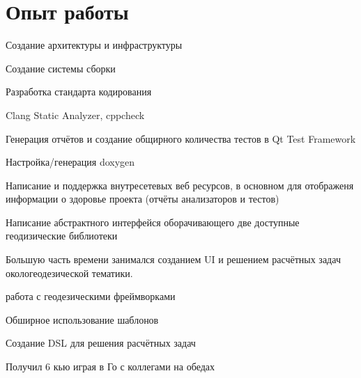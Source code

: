 \documentclass[a4paper]{curricula-vitae}
\begin{document}
\hfill
\begin{minipage}[t]{0.66\textwidth} %

\section{Опыт работы} 


\vspace{\topsep} %
\begin{tightitemize}
\item Создание архитектуры и инфраструктуры
\item Создание системы сборки
\item Разработка стандарта кодирования
\item Clang Static Analyzer, cppcheck
\item Генерация отчётов и создание общирного количества тестов в Qt Test Framework
\item Настройка/генерация doxygen
\item Написание и поддержка внутресетевых веб ресурсов, в основном для отображеня
информации о здоровье проекта (отчёты анализаторов и тестов)
\item Написание абстрактного интерфейся оборачивающего две доступные геодизические библиотеки
\end{tightitemize}

\insertspace


Большую часть времени занимался созданием UI и
решением расчётных задач окологеодезической тематики.
\begin{tightitemize}
\item работа с геодезическими фреймворками
\item Обширное использование шаблонов
\item Создание DSL для решения расчётных задач
\item Получил 6 кью играя в Го с коллегами на обедах %
\end{tightitemize}


\end{minipage}
\end{document}
